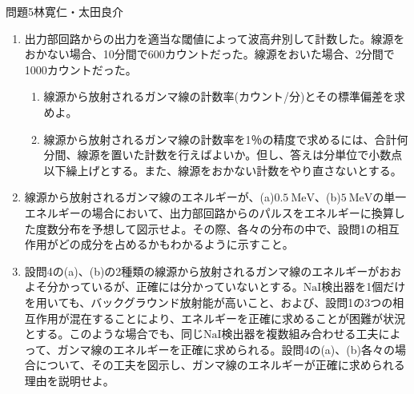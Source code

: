 \documentclass[fleqn]{jbook}
\begin{document}
\begin{question}{問題5}{林寛仁・太田良介}
\begin{enumerate}
\item 出力部回路からの出力を適当な閾値によって波高弁別して計数した。線源をおかない場合、10分間で600カウントだった。線源をおいた場合、2分間で1000カウントだった。\begin{enumerate}
	\item 線源から放射されるガンマ線の計数率(カウント/分)とその標準偏差を求めよ。
	\item 線源から放射されるガンマ線の計数率を1％の精度で求めるには、合計何分間、線源を置いた計数を行えばよいか。但し、答えは分単位で小数点以下繰上げとする。また、線源をおかない計数をやり直さないとする。
\end{enumerate}

\item 線源から放射されるガンマ線のエネルギーが、(a)$0.5 \ \mathrm{MeV}$、(b)$5 \ \mathrm{MeV}$の単一エネルギーの場合において、出力部回路からのパルスをエネルギーに換算した度数分布を予想して図示せよ。その際、各々の分布の中で、設問1の相互作用がどの成分を占めるかもわかるように示すこと。

\item 設問4の(a)、(b)の2種類の線源から放射されるガンマ線のエネルギーがおおよそ分かっているが、正確には分かっていないとする。$\mathrm{NaI}$検出器を1個だけを用いても、バックグラウンド放射能が高いこと、および、設問1の3つの相互作用が混在することにより、エネルギーを正確に求めることが困難が状況とする。このような場合でも、同じ$\mathrm{NaI}$検出器を複数組み合わせる工夫によって、ガンマ線のエネルギーを正確に求められる。設問4の(a)、(b)各々の場合について、その工夫を図示し、ガンマ線のエネルギーが正確に求められる理由を説明せよ。
\end{enumerate}
\end{question}
\end{document}
